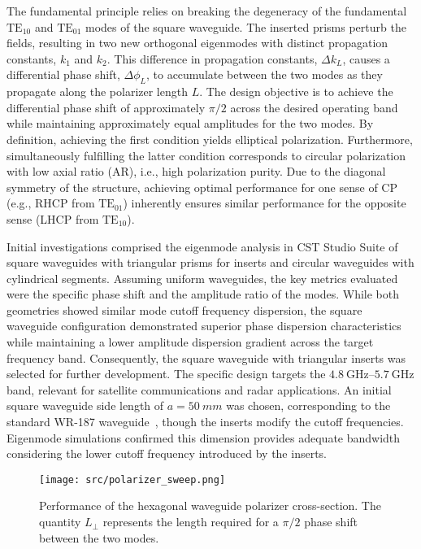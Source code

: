 \documentclass[journal]{IEEEtran}
\newcommand{\frequencyrange}{\qtyrange{4.8}{5.7}{\giga\hertz}}
\newcommand{\TE}[2]{\text{TE}_{#1#2}}
\begin{document}
The fundamental principle relies on breaking the degeneracy of the fundamental $\TE 10$ and $\TE 01$ modes of the square waveguide. The inserted prisms perturb the fields, resulting in two new orthogonal eigenmodes with distinct propagation constants, $k_1$ and $k_2$. This difference in propagation constants, $\Delta k_L$, causes a differential phase shift, $\Delta\phi_L$, to accumulate between the two modes as they propagate along the polarizer length $L$. The design objective is to achieve the differential phase shift of approximately $\pi/2$ across the desired operating band while maintaining approximately equal amplitudes for the two modes. By definition, achieving the first condition yields elliptical polarization. Furthermore, simultaneously fulfilling the latter condition corresponds to circular polarization with low axial ratio (AR), i.e., high polarization purity. Due to the diagonal symmetry of the structure, achieving optimal performance for one sense of CP (e.g., RHCP from $\TE 01$) inherently ensures similar performance for the opposite sense (LHCP from $\TE 10$).

Initial investigations comprised the eigenmode analysis in CST Studio Suite of square waveguides with triangular prisms for inserts and circular waveguides with cylindrical segments. Assuming uniform waveguides, the key metrics evaluated were the specific phase shift and the amplitude ratio of the modes. While both geometries showed similar mode cutoff frequency dispersion, the square waveguide configuration demonstrated superior phase dispersion characteristics while maintaining a lower amplitude dispersion gradient across the target frequency band. Consequently, the square waveguide with triangular inserts was selected for further development. The specific design targets the $\frequencyrange$ band, relevant for satellite communications and radar applications. An initial square waveguide side length of $a = \qty{50}{mm}$ was chosen, corresponding to the standard WR-187 waveguide~\cite{spinner:waveguide-specifications}, though the inserts modify the cutoff frequencies. Eigenmode simulations confirmed this dimension provides adequate bandwidth considering the lower cutoff frequency introduced by the inserts.

\begin{figure}[!ht]
    \centering
    \texttt{[image: src/polarizer\_sweep.png]}
    \caption{\label{fig:polarizer-sweep}Performance of the hexagonal waveguide polarizer cross-section. The quantity $L_\perp$ represents the length required for a $\pi/2$ phase shift between the two modes.}
\end{figure}
\end{document}
